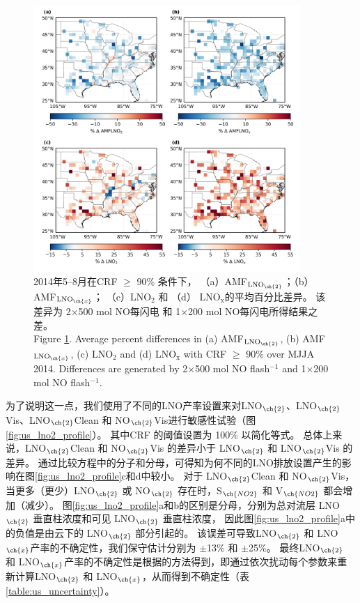 \begin{figure}[H]
\centering
\includegraphics[width=0.9\textwidth]{./figures/us_simulation_diff.png}
\caption{2014年5--8月在CRF $\geq$ 90\% 条件下，
（a）AMF$_{\textrm{LNO$_{\ch{2}}$}}$；（b）AMF$_{\textrm{LNO$_{\ch{x}}$}}$；
（c）LNO$_\textrm{2}$ 和 （d） LNO$_\textrm{x}$的平均百分比差异。
该差异为 2$\times$500 mol NO每闪电 和 1$\times$200 mol NO每闪电所得结果之差。\\
Figure \ref{fig:us_simulation_diff}. Average percent differences in (a) AMF$_{\textrm{LNO$_{\ch{2}}$}}$, (b) AMF$_{\textrm{LNO$_{\ch{x}}$}}$, (c) LNO$_\textrm{2}$ and (d) LNO$_\textrm{x}$ with CRF $\geq$ 90\% over MJJA 2014.
Differences are generated by 2$\times$500 mol NO flash$^{-1}$ and 1$\times$200 mol NO flash$^{-1}$.}
\label{fig:us_simulation_diff}
\end{figure}

为了说明这一点，我们使用了不同的LNO产率设置来对LNO$_{\ch{2}}$、LNO$_{\ch{2}}$Vis、LNO$_{\ch{2}}$Clean 和 NO$_{\ch{2}}$Vis进行敏感性试验（图\ref{fig:us_lno2_profile}）。
其中CRF 的阈值设置为 100\% 以简化等式。
总体上来说，LNO$_{\ch{2}}$Clean 和 NO$_{\ch{2}}$Vis 的差异小于 LNO$_{\ch{2}}$ 和 LNO$_{\ch{2}}$Vis 的差异。
通过比较方程中的分子和分母，可得知为何不同的LNO排放设置产生的影响在图\ref{fig:us_lno2_profile}c和d中较小。
对于 LNO$_{\ch{2}}$Clean 和 NO$_{\ch{2}}$Vis，当更多（更少）LNO$_{\ch{2}}$ 或 NO$_{\ch{2}}$ 存在时，S$_{\ch{NO2}}$ 和 V$_{\ch{NO2}}$ 都会增加（减少）。
图\ref{fig:us_lno2_profile}a和b的区别是分母，分别为总对流层 LNO$_{\ch{2}}$ 垂直柱浓度和可见 LNO$_{\ch{2}}$ 垂直柱浓度，
因此图\ref{fig:us_lno2_profile}a中的负值是由云下的 LNO$_{\ch{2}}$ 部分引起的。
该误差可导致LNO$_{\ch{2}}$ 和 LNO$_{\ch{x}}$产率的不确定性，我们保守估计分别为 $\pm$13\% 和 $\pm$25\%。
最终LNO$_{\ch{2}}$ 和 LNO$_{\ch{x}}$产率的不确定性是根据\citet{Pickering.2016,Allen.2019,Bucsela.2019,Lapierre.2020}的方法得到，即通过依次扰动每个参数来重新计算LNO$_{\ch{2}}$ 和 LNO$_{\ch{x}}$，从而得到不确定性（表\ref{table:us_uncertainty}）。


